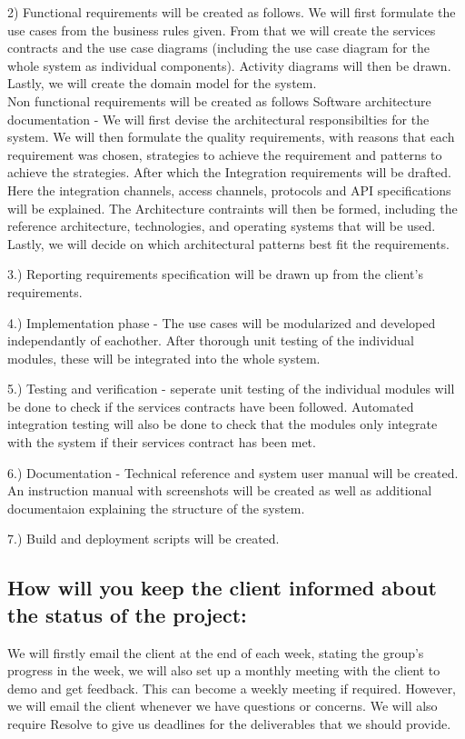\documentclass[hidelinks, 12pt, oneside]{article}
\begin{document}
2) Functional requirements will be created as follows. We will first formulate the use cases from the business rules given. From that we will create the services contracts and the use case diagrams (including the use case diagram for the whole system as individual components). Activity diagrams will then be drawn. Lastly, we will create the domain model for the system.
\\
Non functional requirements will be created as follows
Software architecture documentation - We will first devise the architectural responsibilties for the system. We will then formulate the quality requirements, with reasons that each requirement was chosen, strategies to achieve the requirement and patterns to achieve the strategies. After which the Integration requirements will be drafted. Here the integration channels, access channels, protocols and API specifications will be explained. The Architecture contraints will then be formed, including the reference architecture, technologies, and operating systems that will be used. Lastly, we will decide on which architectural patterns best fit the requirements. 

3.) Reporting requirements specification will be drawn up from the client's requirements. 

4.) Implementation phase - The use cases will be modularized and developed independantly of eachother. After thorough unit testing of the individual modules, these will be integrated into the whole system. 

5.) Testing and verification - seperate unit testing of the individual modules will be done to check if the services contracts have been followed. Automated integration testing will also be done to check that the modules only integrate with the system if their services contract has been met. 

6.) Documentation - Technical reference and system user manual will be created. An instruction manual with screenshots will be created as well as additional documentaion explaining the structure of the system.  

7.) Build and deployment scripts will be created. 

\subsection{How will you keep the client informed about the status of the project:}

We will firstly email the client at the end of each  week, stating the group's progress in the week, we will also set up a monthly meeting with the client to demo and get feedback. This can become a weekly meeting if required. However, we will email the client whenever we have questions or concerns. We will also require Resolve to give us deadlines for the deliverables that we should provide. 
\end{document}
